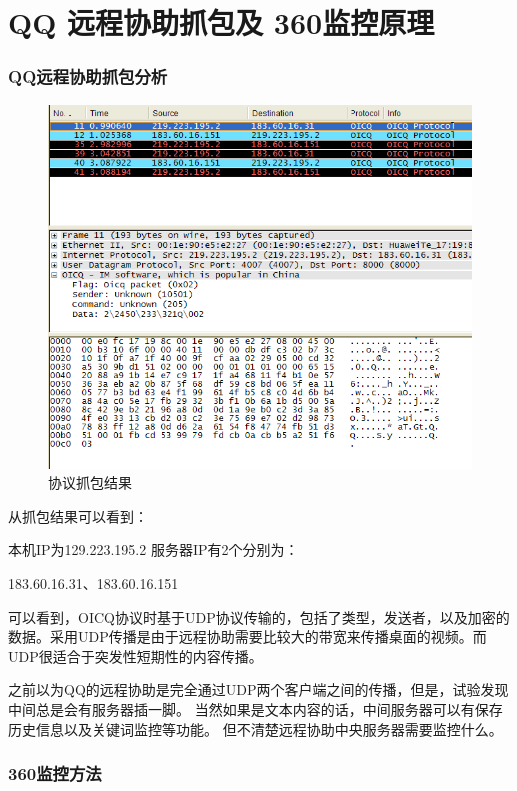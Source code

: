 \documentclass[a4paper]{ctexart}
\begin{document}
    \part{QQ 远程协助抓包及 360监控原理}
    \section{QQ远程协助抓包分析  }
        \begin{figure}[]
            \centering
            \includegraphics[width=400pt]{qq.png}
            \caption{协议抓包结果}
            \label{fig:qq}
        \end{figure}
\par 从抓包结果可以看到：
\par 本机IP为129.223.195.2
服务器IP有2个分别为：
    \par 183.60.16.31、183.60.16.151
    \par 可以看到，OICQ协议时基于UDP协议传输的，包括了类型，发送者，以及加密的数据。采用UDP传播是由于远程协助需要比较大的带宽来传播桌面的视频。而UDP很适合于突发性短期性的内容传播。
    \par 之前以为QQ的远程协助是完全通过UDP两个客户端之间的传播，但是，试验发现中间总是会有服务器插一脚。 当然如果是文本内容的话，中间服务器可以有保存历史信息以及关键词监控等功能。 但不清楚远程协助中央服务器需要监控什么。
    \section{360监控方法}
\end{document}
